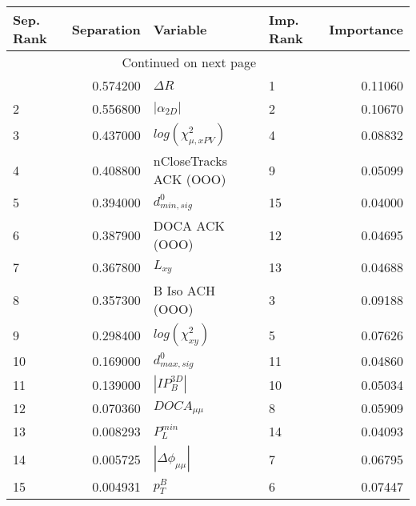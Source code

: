 \usepackage{lscape}

\begin{landscape}
\begin{longtable}{lrllr}
\toprule
Sep. Rank &  Separation &                   Variable & Imp. Rank &  Importance \\
\midrule
\endhead
\midrule
\multicolumn{3}{r}{{Continued on next page}} \\
\midrule
\endfoot

\bottomrule
\endlastfoot
        1 &    0.574200 &                 $\Delta R$ &         1 &     0.11060 \\
        2 &    0.556800 &            $|\alpha_{2D}|$ &         2 &     0.10670 \\
        3 &    0.437000 &  $log(\chi^{2}_{\mu,xPV})$ &         4 &     0.08832 \\
        4 &    0.408800 &     nCloseTracks ACK (OOO) &         9 &     0.05099 \\
        5 &    0.394000 &           $d^0_{min, sig}$ &        15 &     0.04000 \\
        6 &    0.387900 &             DOCA ACK (OOO) &        12 &     0.04695 \\
        7 &    0.367800 &                   $L_{xy}$ &        13 &     0.04688 \\
        8 &    0.357300 &            B Iso ACH (OOO) &         3 &     0.09188 \\
        9 &    0.298400 &       $log(\chi^{2}_{xy})$ &         5 &     0.07626 \\
       10 &    0.169000 &           $d^0_{max, sig}$ &        11 &     0.04860 \\
       11 &    0.139000 &            $|IP_{B}^{3D}|$ &        10 &     0.05034 \\
       12 &    0.070360 &            $DOCA_{\mu\mu}$ &         8 &     0.05909 \\
       13 &    0.008293 &              $P^{min}_{L}$ &        14 &     0.04093 \\
       14 &    0.005725 &   $|\Delta \phi_{\mu\mu}|$ &         7 &     0.06795 \\
       15 &    0.004931 &                  $p^B_{T}$ &         6 &     0.07447 \\
\end{longtable}

\end{landscape}
